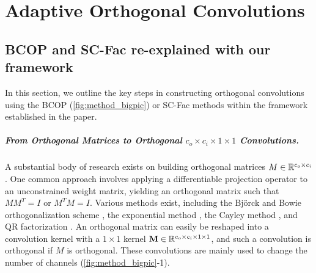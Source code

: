 \chapter{Adaptive Orthogonal Convolutions}

\section{BCOP and SC-Fac re-explained with our framework}\label{ap:BCOP_detail}
In this section, we  outline the key steps in constructing orthogonal convolutions using  the BCOP (\cref{fig:method_bigpic}) or SC-Fac methods within the framework established in the paper.

    \paragraph{From Orthogonal Matrices to Orthogonal $c_o \times c_i\times 1 \times 1$ Convolutions.}  
    A substantial body of research exists on building orthogonal matrices $M \in \mathbb{R}^{c_o \times c_i}$. One common approach involves applying a differentiable projection operator to an unconstrained weight matrix, yielding an orthogonal matrix such that $M M^T = I$ or $M^T M = I$. Various methods exist, including the Björck and Bowie orthogonalization scheme \cite{bjorck1971iterative}, the exponential method \cite{singla_skew_2021}, the Cayley method \cite{trockman_orthogonalizing_2021}, and QR factorization \cite{van2018sylvester}. An orthogonal matrix can easily be reshaped into a convolution kernel with a $1 \times 1$ kernel $\mathbf{M} \in \mathbb{R}^{c_o \times c_i \times 1 \times 1}$, and such a convolution is orthogonal if $M$ is orthogonal. These convolutions are mainly used to change the number of channels (\cref{fig:method_bigpic}-1).
    
